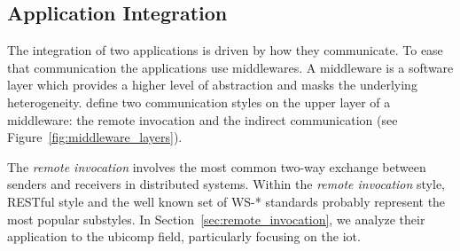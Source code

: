 \subsection{Application Integration}
\label{sec:soa_integration}

%
%


The integration of two applications is driven by how they communicate.
To ease that communication the applications use middlewares.
A middleware is a software layer which provides a higher level of abstraction and masks the underlying heterogeneity.
\citet{coulouris_distributed_2012} define two communication styles on the upper layer of a middleware: %
the remote invocation and the indirect communication (see Figure~\ref{fig:middleware_layers}).



The \emph{remote invocation} involves the most common two-way exchange between senders and receivers in distributed systems.
Within the \emph{remote invocation} style, RESTful style \citep{fielding_architectural_2000} and the well known set of WS-* \citep{alonso_web_2010} standards probably represent the most popular substyles.
In Section~\ref{sec:remote_invocation}, we analyze their application to the \ac{ubicomp} field, particularly focusing on the \ac{iot}.


\medskip


